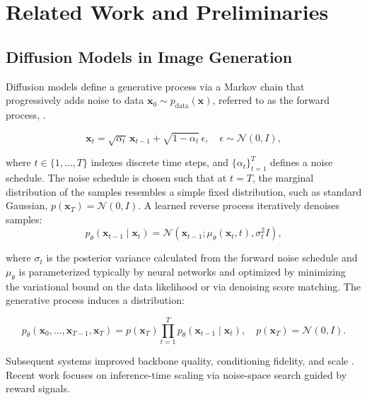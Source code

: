 \documentclass{article}
\begin{document}
\section{Related Work and Preliminaries}

\subsection{Diffusion Models in Image Generation}

Diffusion models define a generative process via a Markov chain that progressively adds noise to data $\mathbf{x}_{0}\sim p_{\text{data}}(\mathbf{x})$, referred to as the forward process,
 \citep{ho2020ddpm,nichol2021improved}.

\begin{equation}
    \mathbf{x}_{t} = \sqrt{\alpha_{t}}\,\mathbf{x}_{t-1} + \sqrt{1-\alpha_{t}}\,\epsilon,\quad\epsilon\sim\mathcal{N}(0,I),
\end{equation}

where $t\in\{1,\ldots,T\}$ indexes discrete time steps, and $\{\alpha_{t}\}_{t=1}^{T}$ defines a noise schedule. The noise schedule is chosen such that at $t=T$, the marginal distribution of the samples resembles a simple fixed distribution, such as standard Gaussian, $p(\mathbf{x}_{T})=\mathcal{N}(0,I)$. A learned reverse process iteratively denoises samples:
\begin{equation}
    p_{\theta}(\mathbf{x}_{t-1}\mid\mathbf{x}_{t}) = \mathcal{N}(\mathbf{x}_{t-1};\mu_{\theta}(\mathbf{x}_{t},t),\sigma_{t}^{2}I),
\end{equation}

where $\sigma_{t}$ is the posterior variance calculated from the forward noise schedule and $\mu_{\theta}$ is parameterized typically by neural networks and optimized by minimizing the variational bound on the data likelihood or via denoising score matching. The generative process induces a distribution:

\begin{equation}\label{eq:1}
p_{\theta}(\mathbf{x}_{0},\ldots,\mathbf{x}_{T-1},\mathbf{x}_{T}) = p(\mathbf{x}_{T})\prod_{t=1}^{T}p_{\theta}(\mathbf{x}_{t-1}\mid\mathbf{x}_{t}),\quad p(\mathbf{x}_{T}) = \mathcal{N}(0,I).
\end{equation}

Subsequent systems improved backbone quality, conditioning fidelity, and scale \citep{saharia2022imagen,podell2023sdxl}. Recent work focuses on inference-time scaling via noise-space search guided by reward signals.
\end{document}
